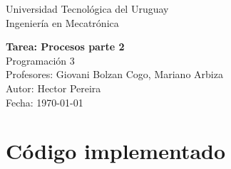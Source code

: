 \documentclass[11pt]{article}
\begin{document}
\begin{titlepage}
  \centering
  {\large Universidad Tecnológica del Uruguay \\[0.5cm]}
  {\large Ingeniería en Mecatrónica \\[2cm]}

  {\Huge \textbf{Tarea: Procesos parte 2}}\\[1cm]

  {\Large Programación 3}\\[0.5cm]
  {\Large Profesores: Giovani Bolzan Cogo, Mariano Arbiza}\\[1.5cm]

  \vfill
  {\large Autor: Hector Pereira}\\
  {\large Fecha: \today}
\end{titlepage}






\section{Código implementado}

\end{document}
